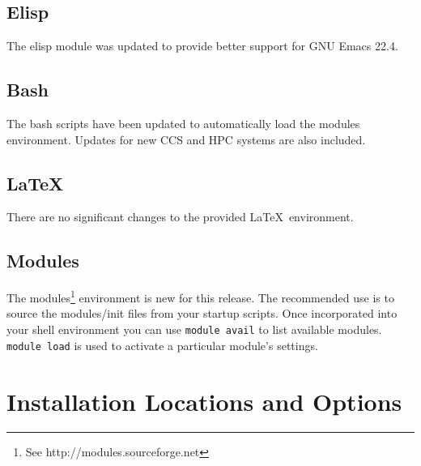 \documentclass[note]{ResearchNote}
\begin{document}
\subsection{Elisp}

The elisp module was updated to provide better support for GNU Emacs 22.4.

\subsection{Bash}

The bash scripts have been updated to automatically load the modules
environment.  Updates for new CCS and HPC systems are also included.

\subsection{\LaTeX}

There are no significant changes to the provided \LaTeX\ environment.

\subsection{Modules}

The modules\footnote{See http://modules.sourceforge.net} environment
is new for this release.  The recommended use is to source the
modules/init files from your startup scripts.  Once incorporated into
your shell environment you can use \texttt{module avail} to list
available modules.  \texttt{module load} is used to activate a
particular module's settings.


\section{Installation Locations and Options}
\end{document}

